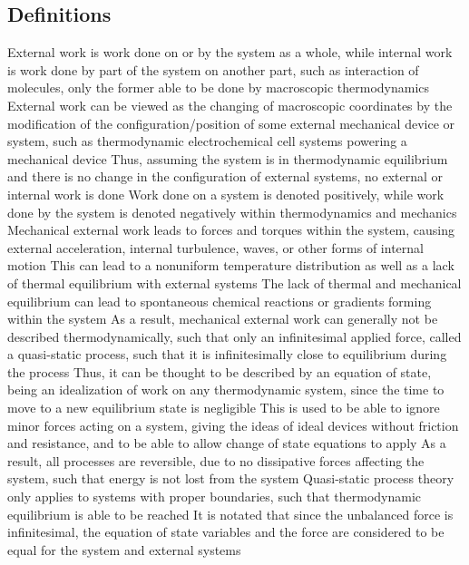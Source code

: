 \documentclass[11 pt, twoside]{article}
\newenvironment{outline*}
{
	\begin{outline}[enumerate]
	}
	{\end{outline}
}
\begin{document}
\subsection{Definitions}
\begin{outline*}
\1 External work is work done on or by the system as a whole, while internal work is work done by part of the system on another part, such as interaction of molecules, only the former able to be done by macroscopic thermodynamics
\2 External work can be viewed as the changing of macroscopic coordinates by the modification of the configuration/position of some external mechanical device or system, such as thermodynamic electrochemical cell systems powering a mechanical device
\3 Thus, assuming the system is in thermodynamic equilibrium and there is no change in the configuration of external systems, no external or internal work is done
\2 Work done on a system is denoted positively, while work done by the system is denoted negatively within thermodynamics and mechanics
\1 Mechanical external work leads to forces and torques within the system, causing external acceleration, internal turbulence, waves, or other forms of internal motion
\2 This can lead to a nonuniform temperature distribution as well as a lack of thermal equilibrium with external systems
\3 The lack of thermal and mechanical equilibrium can lead to spontaneous chemical reactions or gradients forming within the system
\2 As a result, mechanical external work can generally not be described thermodynamically, such that only an infinitesimal applied force, called a quasi-static process, such that it is infinitesimally close to equilibrium during the process
\3 Thus, it can be thought to be described by an equation of state, being an idealization of work on any thermodynamic system, since the time to move to a new equilibrium state is negligible
\3 This is used to be able to ignore minor forces acting on a system, giving the ideas of ideal devices without friction and resistance, and to be able to allow change of state equations to apply
\3 As a result, all processes are reversible, due to no dissipative forces affecting the system, such that energy is not lost from the system
\2 Quasi-static process theory only applies to systems with proper boundaries, such that thermodynamic equilibrium is able to be reached
\2 It is notated that since the unbalanced force is infinitesimal, the equation of state variables and the force are considered to be equal for the system and external systems
\end{outline*}
\end{document}
